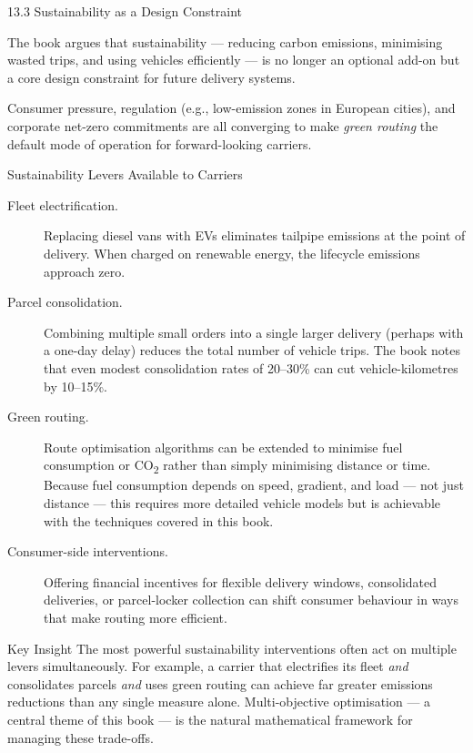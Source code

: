 \documentclass[aspectratio=169,10pt]{beamer}
\begin{document}
\begin{frame}[allowframebreaks]{13.3 Sustainability as a Design Constraint}

  The book argues that sustainability --- reducing carbon emissions,
  minimising wasted trips, and using vehicles efficiently --- is
  no longer an optional add-on but a core design constraint for
  future delivery systems.

  \bigskip
  Consumer pressure, regulation (e.g., low-emission zones in
  European cities), and corporate net-zero commitments are all
  converging to make \emph{green routing} the default mode of
  operation for forward-looking carriers.

  \bigskip
  \begin{block}{Sustainability Levers Available to Carriers}
    \begin{description}
      \item[Fleet electrification.]
            Replacing diesel vans with EVs eliminates tailpipe
            emissions at the point of delivery.  When charged on
            renewable energy, the lifecycle emissions approach zero.

      \item[Parcel consolidation.]
            Combining multiple small orders into a single larger
            delivery (perhaps with a one-day delay) reduces the
            total number of vehicle trips.  The book notes that
            even modest consolidation rates of 20--30\% can
            cut vehicle-kilometres by 10--15\%.

      \item[Green routing.]
            Route optimisation algorithms can be extended to
            minimise fuel consumption or CO\textsubscript{2} rather
            than simply minimising distance or time.
            Because fuel consumption depends on speed, gradient,
            and load --- not just distance --- this requires more
            detailed vehicle models but is achievable with the
            techniques covered in this book.

      \item[Consumer-side interventions.]
            Offering financial incentives for flexible delivery
            windows, consolidated deliveries, or parcel-locker
            collection can shift consumer behaviour in ways that
            make routing more efficient.
    \end{description}
  \end{block}

  \bigskip
  \begin{alertblock}{Key Insight}
    The most powerful sustainability interventions often act on
    multiple levers simultaneously.  For example, a carrier that
    electrifies its fleet \emph{and} consolidates parcels \emph{and}
    uses green routing can achieve far greater emissions reductions
    than any single measure alone.  Multi-objective optimisation ---
    a central theme of this book --- is the natural mathematical
    framework for managing these trade-offs.
  \end{alertblock}

\end{frame}
\end{document}
